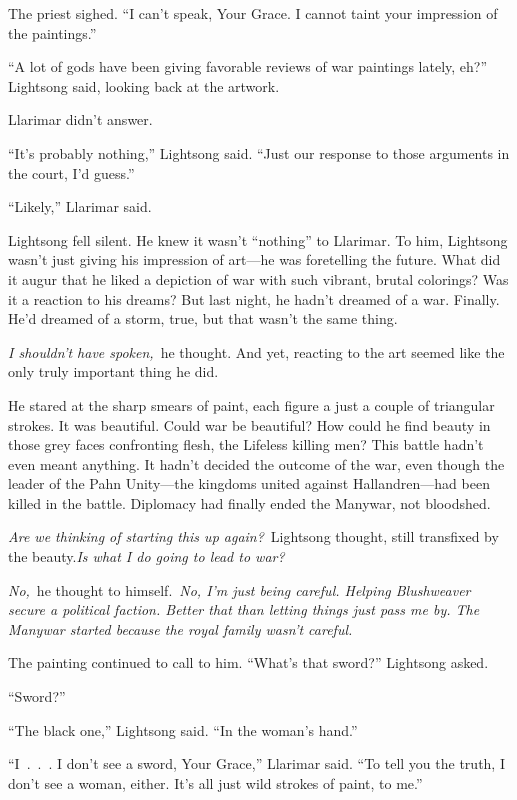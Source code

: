 The priest sighed. “I can’t speak, Your Grace. I cannot taint your impression of the paintings.”

“A lot of gods have been giving favorable reviews of war paintings lately, eh?” Lightsong said, looking back at the artwork.

Llarimar didn’t answer.

“It’s probably nothing,” Lightsong said. “Just our response to those arguments in the court, I’d guess.”

“Likely,” Llarimar said.

Lightsong fell silent. He knew it wasn’t “nothing” to Llarimar. To him, Lightsong wasn’t just giving his impression of art—he was foretelling the future. What did it augur that he liked a depiction of war with such vibrant, brutal colorings? Was it a reaction to his dreams? But last night, he hadn’t dreamed of a war. Finally. He’d dreamed of a storm, true, but that wasn’t the same thing.

\textit{I shouldn’t have spoken,}~he thought. And yet, reacting to the art seemed like the only truly important thing he did.

He stared at the sharp smears of paint, each figure a just a couple of triangular strokes. It was beautiful. Could war be beautiful? How could he find beauty in those grey faces confronting flesh, the Lifeless killing men? This battle hadn’t even meant anything. It hadn’t decided the outcome of the war, even though the leader of the Pahn Unity—the kingdoms united against Hallandren—had been killed in the battle. Diplomacy had finally ended the Manywar, not bloodshed.

\textit{Are we thinking of starting this up again?}~Lightsong thought, still transfixed by the beauty.\textit{Is what I do going to lead to war?}

\textit{No,}~he thought to himself.~\textit{No, I’m just being careful. Helping Blushweaver secure a political faction. Better that than letting things just pass me by. The Manywar started because the royal family wasn’t careful.}

The painting continued to call to him. “What’s that sword?” Lightsong asked.

“Sword?”

“The black one,” Lightsong said. “In the woman’s hand.”

“I~.~.~. I don’t see a sword, Your Grace,” Llarimar said. “To tell you the truth, I don’t see a woman, either. It’s all just wild strokes of paint, to me.”

